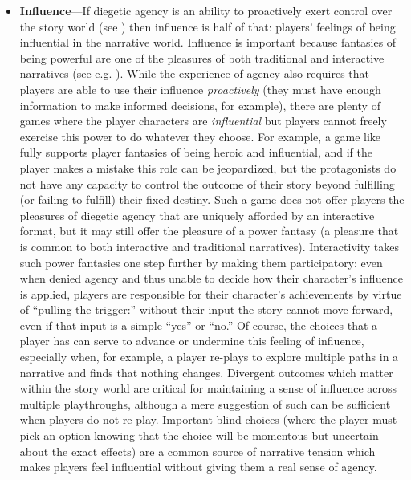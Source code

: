 \begin{itemize}
\item \textbf{Influence}---If diegetic agency is an ability to proactively exert control over the story world (see \citep{Mason2013}) then influence is half of that: players' feelings of being influential in the narrative world.
%
Influence is important because fantasies of being powerful are one of the pleasures of both traditional and interactive narratives (see e.g. \citep{Olson2008}).
%
While the experience of agency also requires that players are able to use their influence \emph{proactively} (they must have enough information to make informed decisions, for example), there are plenty of games where the player characters are \emph{influential} but players cannot freely exercise this power to do whatever they choose.
%
For example, a game like  \citep{FinalFantasy} fully supports player fantasies of being heroic and influential, and if the player makes a mistake this role can be jeopardized, but the protagonists do not have any capacity to control the outcome of their story beyond fulfilling (or failing to fulfill) their fixed destiny.
%
Such a game does not offer players the pleasures of diegetic agency that are uniquely afforded by an interactive format, but it may still offer the pleasure of a power fantasy (a pleasure that is common to both interactive and traditional narratives).
%
Interactivity takes such power fantasies one step further by making them participatory: even when denied agency and thus unable to decide how their character's influence is applied, players are responsible for their character's achievements by virtue of ``pulling the trigger:'' without their input the story cannot move forward, even if that input is a simple ``yes'' or ``no.''
%
Of course, the choices that a player has can serve to advance or undermine this feeling of influence, especially when, for example, a player re-plays to explore multiple paths in a narrative and finds that nothing changes.
%
Divergent outcomes which matter within the story world are critical for maintaining a sense of influence across multiple playthroughs, although a mere suggestion of such can be sufficient when players do not re-play.
%
Important blind choices (where the player must pick an option knowing that the choice will be momentous but uncertain about the exact effects) are a common source of narrative tension which makes players feel influential without giving them a real sense of agency.



\end{itemize}
